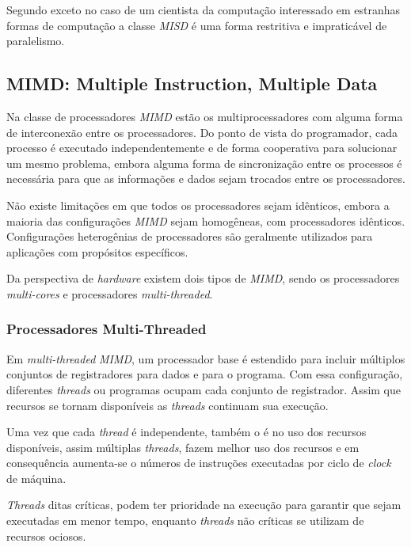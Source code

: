 Segundo \cite{Openshaw:1999} exceto no caso de um cientista da computação
interessado em estranhas formas de computação a classe \textit{MISD} é uma forma
restritiva e impraticável de paralelismo.

\subsection{MIMD: Multiple Instruction, Multiple Data}

Na classe de processadores \textit{MIMD} estão os multiprocessadores
com alguma forma de interconexão entre os processadores. Do ponto de vista do
programador, cada processo é executado independentemente e de forma cooperativa
para solucionar um mesmo problema, embora alguma forma de sincronização entre os
processos é necessária para que as informações e dados sejam trocados entre os
processadores.

Não existe limitações em que todos os processadores sejam idênticos, embora a
maioria das configurações \textit{MIMD} sejam homogêneas, com processadores
idênticos. Configurações heterogênias de processadores são geralmente utilizados
para aplicações com propósitos específicos.

Da perspectiva de \textit{hardware} existem dois tipos de \textit{MIMD}, sendo os
processadores \textit{multi-cores} e processadores \textit{multi-threaded}.


\subsubsection{Processadores Multi-Threaded}

Em \textit{multi-threaded} \textit{MIMD}, um processador base é
estendido para incluir múltiplos conjuntos de registradores para dados e para o
programa.
Com essa configuração, diferentes \textit{threads} ou programas ocupam cada
conjunto de registrador. Assim que recursos se tornam disponíveis as
\textit{threads} continuam sua execução.

Uma vez que cada \textit{thread} é independente, também o é no uso dos recursos
disponíveis, assim múltiplas \textit{threads}, fazem melhor uso dos recursos e
em consequência aumenta-se o números de instruções executadas por ciclo de
\textit{clock} de máquina.

\textit{Threads} ditas críticas, podem ter prioridade na execução para garantir
que sejam executadas em menor tempo, enquanto \textit{threads} não críticas se
utilizam de recursos ociosos.


